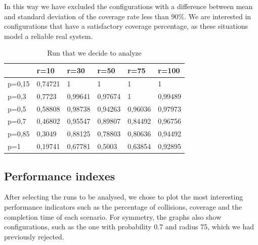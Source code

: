 In this way we have excluded the configurations with a difference between mean and standard deviation of the coverage rate less than 90\%. We are interested in configurations that have a satisfactory coverage percentage, as these situations model a reliable real system.
\begin{table}[H]
\centering
\begin{tabular}{|l|l|l|l|l|l|}
\hline
       & r=10    & r=30                            & r=50                            & r=75                            & r=100                           \\ \hline
p=0,15 & 0,74721 & \cellcolor[HTML]{92D050}1       & \cellcolor[HTML]{92D050}1       & \cellcolor[HTML]{92D050}1       & \cellcolor[HTML]{92D050}1       \\ \hline
p=0,3  & 0,7723  & \cellcolor[HTML]{92D050}0,99641 & \cellcolor[HTML]{92D050}0,97674 & \cellcolor[HTML]{92D050}1       & \cellcolor[HTML]{92D050}0,99489 \\ \hline
p=0,5  & 0,58808 & \cellcolor[HTML]{92D050}0,98738 & \cellcolor[HTML]{92D050}0,94263 & \cellcolor[HTML]{92D050}0,96036 & \cellcolor[HTML]{92D050}0,97973 \\ \hline
p=0,7  & 0,46802 & \cellcolor[HTML]{92D050}0,95547 & 0,89807                         & 0,84492                         & \cellcolor[HTML]{92D050}0,96756 \\ \hline
p=0,85 & 0,3049  & 0,88125                         & 0,78803                         & 0,80636                         & \cellcolor[HTML]{92D050}0,94492 \\ \hline
p=1    & 0,19741 & 0,67781                         & 0,5003                          & 0,63854                         & \cellcolor[HTML]{92D050}0,92895 \\ \hline
\end{tabular}
\caption{Run that we decide to analyze}
\label{tab:run-to-analyze}
\end{table}

\subsection{Performance indexes}
After selecting the runs to be analysed, we chose to plot the most interesting performance indicators such as the percentage of collisions, coverage and the completion time of each scenario. For symmetry, the graphs also show configurations, such as the one with probability 0.7 and radius 75, which we had previously rejected.

